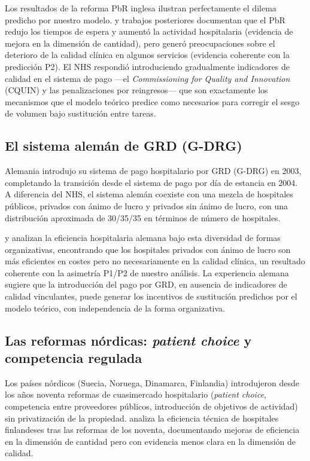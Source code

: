 Los resultados de la reforma PbR inglesa ilustran perfectamente el dilema predicho por nuestro modelo. \citet{street2003} y trabajos posteriores documentan que el PbR redujo los tiempos de espera y aumentó la actividad hospitalaria (evidencia de mejora en la dimensión de cantidad), pero generó preocupaciones sobre el deterioro de la calidad clínica en algunos servicios (evidencia coherente con la predicción P2). El NHS respondió introduciendo gradualmente indicadores de calidad en el sistema de pago ---el \textit{Commissioning for Quality and Innovation} (CQUIN) y las penalizaciones por reingresos--- que son exactamente los mecanismos que el modelo teórico predice como necesarios para corregir el sesgo de volumen bajo sustitución entre tareas.

\subsection{El sistema alemán de GRD (G-DRG)}

Alemania introdujo su sistema de pago hospitalario por GRD (G-DRG) en 2003, completando la transición desde el sistema de pago por día de estancia en 2004. A diferencia del NHS, el sistema alemán coexiste con una mezcla de hospitales públicos, privados con ánimo de lucro y privados sin ánimo de lucro, con una distribución aproximada de 30/35/35 en términos de número de hospitales.

\citet{herr2011} y \citet{tiemann2012} analizan la eficiencia hospitalaria alemana bajo esta diversidad de formas organizativas, encontrando que los hospitales privados con ánimo de lucro son más eficientes en costes pero no necesariamente en la calidad clínica, un resultado coherente con la asimetría P1/P2 de nuestro análisis. La experiencia alemana sugiere que la introducción del pago por GRD, en ausencia de indicadores de calidad vinculantes, puede generar los incentivos de sustitución predichos por el modelo teórico, con independencia de la forma organizativa.

\subsection{Las reformas nórdicas: \textit{patient choice} y competencia regulada}

Los países nórdicos (Suecia, Noruega, Dinamarca, Finlandia) introdujeron desde los años noventa reformas de cuasimercado hospitalario (\textit{patient choice}, competencia entre proveedores públicos, introducción de objetivos de actividad) sin privatización de la propiedad. \citet{linna1998} analiza la eficiencia técnica de hospitales finlandeses tras las reformas de los noventa, documentando mejoras de eficiencia en la dimensión de cantidad pero con evidencia menos clara en la dimensión de calidad.

